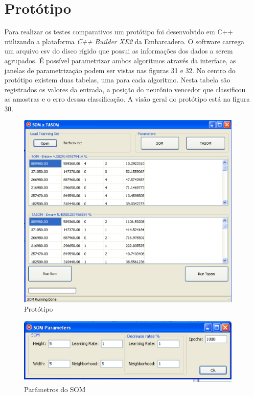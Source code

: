 \section{Protótipo}
Para realizar os testes comparativos um protótipo foi desenvolvido em C++ utilizando a plataforma \textit{C++ Builder XE2} da Embarcadero. O software carrega um arquivo csv do disco rígido que possui as informações dos dados a serem agrupados. É possível parametrizar ambos algoritmos através da interface, as janelas de parametrização podem ser vistas nas figuras 31 e 32. No centro do protótipo existem duas tabelas, uma para cada algoritmo. Nesta tabela são registrados os valores da entrada, a posição do neurônio vencedor que classificou as amostras e o erro desssa classificação. A visão geral do protótipo está na figura 30. 

\begin{figure}[!h]
\centering
\includegraphics[keepaspectratio=true,scale=0.5]
{figuras/proto.eps}
\caption{Protótipo}
\label{data_titatic}
\end{figure}

\begin{figure}[!h]
\centering
\includegraphics[keepaspectratio=true,scale=0.5]
{figuras/somparams.eps}
\caption{Parâmetros do SOM}
\label{data_titatic}
\end{figure}

